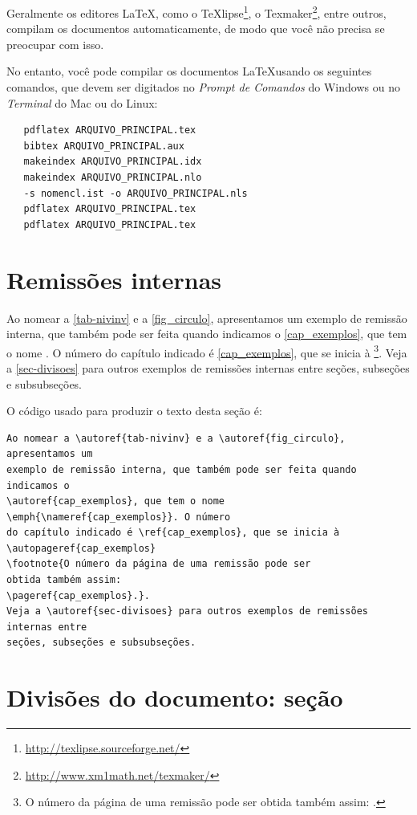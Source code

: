 Geralmente os editores \LaTeX, como o
TeXlipse\footnote{\url{http://texlipse.sourceforge.net/}}, o
Texmaker\footnote{\url{http://www.xm1math.net/texmaker/}}, entre outros,
compilam os documentos automaticamente, de modo que você não precisa se
preocupar com isso.

No entanto, você pode compilar os documentos \LaTeX usando os seguintes
comandos, que devem ser digitados no \emph{Prompt de Comandos} do Windows ou no
\emph{Terminal} do Mac ou do Linux:

\begin{verbatim}
   pdflatex ARQUIVO_PRINCIPAL.tex
   bibtex ARQUIVO_PRINCIPAL.aux
   makeindex ARQUIVO_PRINCIPAL.idx 
   makeindex ARQUIVO_PRINCIPAL.nlo
   -s nomencl.ist -o ARQUIVO_PRINCIPAL.nls
   pdflatex ARQUIVO_PRINCIPAL.tex
   pdflatex ARQUIVO_PRINCIPAL.tex
\end{verbatim}

\section{Remissões internas}

Ao nomear a \autoref{tab-nivinv} e a \autoref{fig_circulo}, apresentamos um
exemplo de remissão interna, que também pode ser feita quando indicamos o
\autoref{cap_exemplos}, que tem o nome \emph{}. O número
do capítulo indicado é \ref{cap_exemplos}, que se inicia à
\footnote{O número da página de uma remissão pode ser
obtida também assim:
\pageref{cap_exemplos}.}.
Veja a \autoref{sec-divisoes} para outros exemplos de remissões internas entre
seções, subseções e subsubseções.

O código usado para produzir o texto desta seção é:

\begin{verbatim}
Ao nomear a \autoref{tab-nivinv} e a \autoref{fig_circulo}, apresentamos um
exemplo de remissão interna, que também pode ser feita quando indicamos o
\autoref{cap_exemplos}, que tem o nome
\emph{\nameref{cap_exemplos}}. O número
do capítulo indicado é \ref{cap_exemplos}, que se inicia à
\autopageref{cap_exemplos}
\footnote{O número da página de uma remissão pode ser
obtida também assim:
\pageref{cap_exemplos}.}.
Veja a \autoref{sec-divisoes} para outros exemplos de remissões internas entre
seções, subseções e subsubseções.
\end{verbatim}

\section{Divisões do documento: seção}\label{sec-divisoes}

